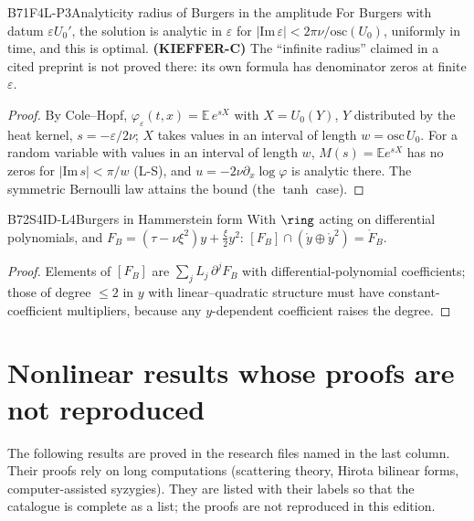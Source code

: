 \begin{dimcard}{B71}{F4L-P3}{Analyticity radius of Burgers in the amplitude}{\pw}{}
For Burgers with datum $\varepsilon U_0'$, the solution is analytic in $\varepsilon$ for $|\mathrm{Im}\,\varepsilon|<2\pi\nu/\mathrm{osc}(U_0)$, uniformly in time, and this is optimal. \textbf{(KIEFFER-C)} The ``infinite radius'' claimed in a cited preprint is not proved there: its own formula has denominator zeros at finite $\varepsilon$.
\end{dimcard}
\begin{proof}
By Cole--Hopf, $\varphi_\varepsilon(t,x)=\mathbb E\,e^{sX}$ with $X=U_0(Y)$, $Y$ distributed by the heat kernel, $s=-\varepsilon/2\nu$; $X$ takes values in an interval of length $w=\mathrm{osc}\,U_0$.
For a random variable with values in an interval of length $w$, $M(s)=\mathbb E e^{sX}$ has no zeros for $|\mathrm{Im}\,s|<\pi/w$ (L-S), and $u=-2\nu\partial_x\log\varphi$ is analytic there. The symmetric Bernoulli law attains the bound (the $\tanh$ case).
\end{proof}

\begin{dimcard}{B72}{S4ID-L4}{Burgers in Hammerstein form}{\pw}{}
With $\ring$ acting on differential polynomials, and $F_B=(\tau-\nu\xi^2)y+\tfrac\xi2y^2$: $[F_B]\cap(\ring y\oplus\ring y^2)=\ring F_B$.
\end{dimcard}
\begin{proof}
Elements of $[F_B]$ are $\sum_jL_j\,\partial^jF_B$ with differential-polynomial coefficients; those of degree $\le2$ in $y$ with linear--quadratic structure must have constant-coefficient multipliers, because any $y$-dependent coefficient raises the degree.
\end{proof}

\section{Nonlinear results whose proofs are not reproduced}

The following results are proved in the research files named in the last column. Their proofs rely on long computations (scattering theory, Hirota bilinear forms, computer-assisted syzygies). They are listed with their labels so that the catalogue is complete as a list; the proofs are not reproduced in this edition.

